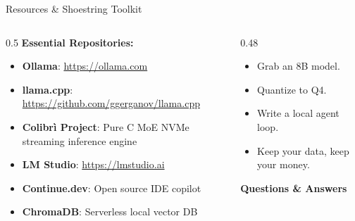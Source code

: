 \documentclass[10pt,aspectratio=169]{beamer}
\begin{document}
\begin{frame}{Resources \& Shoestring Toolkit}
    \begin{columns}[T]
        \begin{column}{0.5\textwidth}
            \textbf{Essential Repositories:}
            \begin{itemize}
                \item \textbf{Ollama}: \url{https://ollama.com}
                \item \textbf{llama.cpp}: \url{https://github.com/ggerganov/llama.cpp}
                \item \textbf{Colibr\`i Project}: Pure C MoE NVMe streaming inference engine
                \item \textbf{LM Studio}: \url{https://lmstudio.ai}
                \item \textbf{Continue.dev}: Open source IDE copilot
                \item \textbf{ChromaDB}: Serverless local vector DB
            \end{itemize}
        \end{column}
        \begin{column}{0.48\textwidth}
            \begin{tcolorbox}[colback=ShoePrimary!10, colframe=ShoePrimary, title=\textbf{Now Go Build!}]
                \small
                \begin{itemize}
                    \item Grab an 8B model.
                    \item Quantize to Q4.
                    \item Write a local agent loop.
                    \item Keep your data, keep your money.
                \end{itemize}
                \vspace{0.2cm}
                \textbf{Questions \& Answers}
            \end{tcolorbox}
        \end{column}
    \end{columns}
\end{frame}
\end{document}
